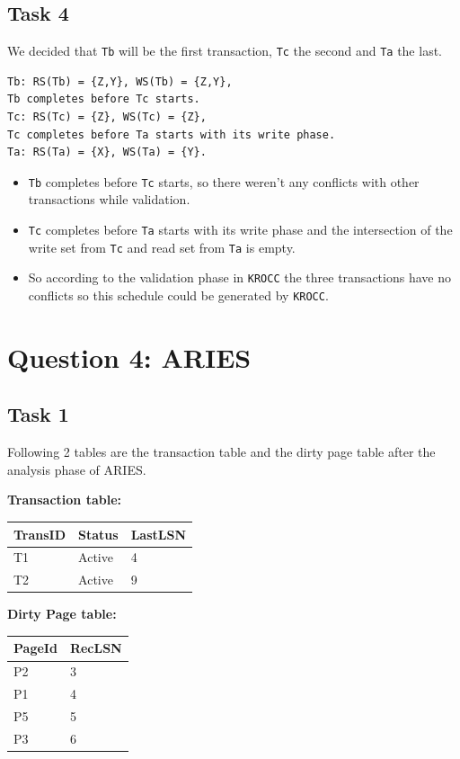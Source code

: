 \documentclass[12pt,a4paper]{article}
\begin{document}
\subsection{Task 4}
We decided that \texttt{Tb} will be the first transaction, \texttt{Tc} the second and \texttt{Ta} the last.
\begin{verbatim}
Tb: RS(Tb) = {Z,Y}, WS(Tb) = {Z,Y},
Tb completes before Tc starts.
Tc: RS(Tc) = {Z}, WS(Tc) = {Z},
Tc completes before Ta starts with its write phase.
Ta: RS(Ta) = {X}, WS(Ta) = {Y}.
\end{verbatim}

\begin{itemize}
	\item \texttt{Tb} completes before \texttt{Tc} starts, so there weren't any conflicts with other transactions while validation.	
	\item \texttt{Tc} completes before \texttt{Ta} starts with its write phase and the intersection of the write set from \texttt{Tc} and read set from \texttt{Ta} is empty.
	\item So according to the validation phase in \texttt{KROCC} the three transactions have no conflicts so this schedule could be generated by \texttt{KROCC}.
\end{itemize}

\newpage
\section{Question 4: ARIES}
\subsection{Task 1}
Following 2 tables are the transaction table and the dirty page table after the analysis phase of ARIES.

\textbf{Transaction table:}
\begin{table}[!htbp]
    \centering
    \begin{tabularx}{\textwidth}{l|l|l}
        \hline
        TransID & Status & LastLSN \\ 
        \hline
        T1 & Active & 4 \\
        T2 & Active & 9 \\         
        \hline
    \end{tabularx}
\end{table}

\textbf{Dirty Page table:}
\begin{table}[!htbp]
    \centering
    \begin{tabularx}{\textwidth}{l|l}
        \hline
        PageId & RecLSN \\ 
        \hline
        P2 & 3 \\
        P1 & 4 \\
        P5 & 5 \\
        P3 & 6 \\         
        \hline
    \end{tabularx}
\end{table}
\end{document}
